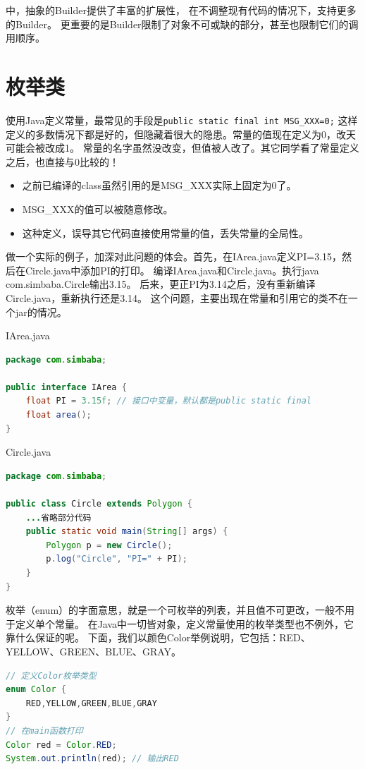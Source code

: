 \noindent
{}中，抽象的Builder提供了丰富的扩展性，
在不调整现有代码的情况下，支持更多的Builder。
更重要的是Builder限制了对象不可或缺的部分，甚至也限制它们的调用顺序。


\section{枚举类}
使用Java定义常量，最常见的手段是\lstinline{public static final int MSG_XXX=0;}
这样定义的多数情况下都是好的，但隐藏着很大的隐患。常量的值现在定义为0，改天可能会被改成1。
常量的名字虽然没改变，但值被人改了。其它同学看了常量定义之后，也直接与0比较的！

\begin{itemize}
\item [1.] 之前已编译的class虽然引用的是MSG\_XXX实际上固定为0了。
\item [2.] MSG\_XXX的值可以被随意修改。
\item [3.] 这种定义，误导其它代码直接使用常量的值，丢失常量的全局性。
\end{itemize}

\noindent
做一个实际的例子，加深对此问题的体会。首先，在IArea.java定义PI=3.15，然后在Circle.java中添加PI的打印。
编译IArea.java和Circle.java。执行java com.simbaba.Circle输出3.15。
后来，更正PI为3.14之后，没有重新编译Circle.java，重新执行还是3.14。
这个问题，主要出现在常量和引用它的类不在一个jar的情况。

\noindent IArea.java
\begin{lstlisting}[language=Java,mathescape]
package com.simbaba;
  
public interface IArea {
    float PI = 3.15f; // 接口中变量，默认都是public static final
    float area();
}
\end{lstlisting}

\noindent Circle.java
\begin{lstlisting}[language=Java,mathescape]
package com.simbaba;
  
public class Circle extends Polygon {
    ...省略部分代码
    public static void main(String[] args) {
        Polygon p = new Circle();
        p.log("Circle", "PI=" + PI);
    }
}
\end{lstlisting}

枚举（enum）的字面意思，就是一个可枚举的列表，并且值不可更改，一般不用于定义单个常量。
在Java中一切皆对象，定义常量使用的枚举类型也不例外，它靠什么保证的呢。
下面，我们以颜色Color举例说明，它包括：RED、YELLOW、GREEN、BLUE、GRAY。

\begin{lstlisting}[language=Java,mathescape]
// 定义Color枚举类型
enum Color {
    RED,YELLOW,GREEN,BLUE,GRAY
}
// 在main函数打印
Color red = Color.RED;
System.out.println(red); // 输出RED
\end{lstlisting}

